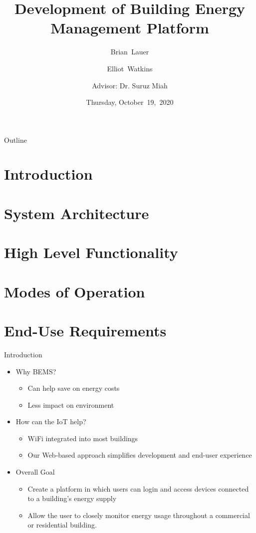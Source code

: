 \documentclass{beamer}
\title[System Level Requirements]{Development of Building Energy Management Platform}
\author[B.~Lauer, E.~Watkins]{Brian~Lauer \and Elliot~Watkins \and
Advisor: Dr. Suruz Miah}
\institute[Bradley University] %
{
  Department of Electrical and Computer Engineering\\
  Bradley University\\
  1501 W. Bradley Avenue\\
  Peoria, IL, 61625, USA
}
\date[October~19,~2020]{Thursday, October~19,~2020}
\begin{document}
\begin{frame}
  \titlepage
\end{frame}

\begin{frame}{Outline} %
  \tableofcontents%
\end{frame}

\section{Introduction}
\section{System Architecture}
\section{High Level Functionality}
\section{Modes of Operation}
\section{End-Use Requirements}

\begin{frame}{Introduction}{} %
    \begin{itemize}
        \item Why BEMS?
            \begin{itemize}
                \item Can help save on energy costs
                \item Less impact on environment
            \end{itemize}
        \item How can the IoT help?
            \begin{itemize}
                \item WiFi integrated into most buildings
                \item Our Web-based approach simplifies development and end-user experience
            \end{itemize}
        \item Overall Goal
            \begin{itemize}
                \item Create a platform in which users can login and access devices connected to a building’s energy supply
                \item Allow the user to closely monitor energy usage throughout a commercial or residential building.
            \end{itemize}
    \end{itemize}
\end{frame}
\end{document}
